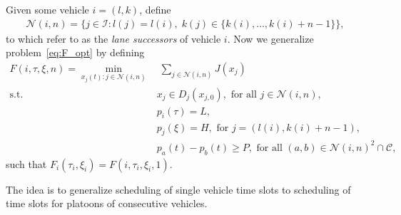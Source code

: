 \documentclass{article}
\theoremstyle{definition}
\theoremstyle{plain}
\begin{document}
Given some vehicle $i = (l, k)$, define
\begin{align}
  \mathcal{N}(i, n) = \{ j \in \mathcal{I} : l(j) = l(i), \; k(j) \in \{ k(i), \dots, k(i) + n - 1\}\} ,
\end{align}
to which refer to as the \textit{lane successors} of vehicle $i$. Now we
generalize problem~\eqref{eq:F_opt} by defining
\begin{subequations}
\begin{align}
  F(i, \tau, \xi, n) = \min_{x_{j}(t) : j \in \mathcal{N}(i, n)} & \; \sum_{j \in \mathcal{N}(i, n)} J(x_{j}) \\
                          \text{s.t. } & x_{j} \in D_{j}(x_{j,0}), \text{ for all  } j \in \mathcal{N}(i, n) , \\
                                       & p_{i}(\tau) = L, \\
                                       & p_{j}(\xi) = H, \text{ for } j = (l(i), k(i) + n - 1) , \\
                                       & p_{a}(t) - p_{b}(t) \geq P, \text{ for all } (a, b) \in \mathcal{N}(i, n)^{2} \cap \mathcal{C} ,
\end{align}
\end{subequations}
%
such that $F_{i}(\tau_{i}, \xi_{i}) = F(i, \tau_{i}, \xi_{i}, 1)$.

The idea is to generalize scheduling of single vehicle time slots to scheduling of time slots for platoons of consecutive vehicles.
\end{document}
